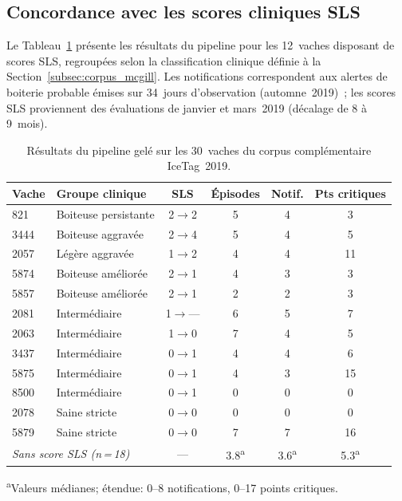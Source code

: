 \subsection{Concordance avec les scores cliniques SLS}

Le Tableau~\ref{tab:mcgill_resultats} présente les résultats du pipeline pour les
12~vaches disposant de scores SLS, regroupées selon la classification clinique
définie à la Section~\ref{subsec:corpus_mcgill}. Les notifications correspondent aux
alertes de boiterie probable émises sur 34~jours d'observation (automne~2019)~; les
scores SLS proviennent des évaluations de janvier et mars~2019 (décalage de 8
à 9~mois).

\begin{table}[H]
    \centering
    \small
    \caption{Résultats du pipeline gelé sur les 30~vaches du corpus complémentaire
    IceTag~2019.}
    \label{tab:mcgill_resultats}
    \begin{tabular}{llcccc}
        \toprule
        \textbf{Vache} & \textbf{Groupe clinique} & \textbf{SLS} &
        \textbf{Épisodes} & \textbf{Notif.} & \textbf{Pts critiques} \\
        \midrule
        821  & Boiteuse persistante & 2$\to$2 & 5 & 4 & 3 \\
        3444 & Boiteuse aggravée    & 2$\to$4 & 5 & 4 & 5 \\
        2057 & Légère aggravée      & 1$\to$2 & 4 & 4 & 11 \\
        5874 & Boiteuse améliorée   & 2$\to$1 & 4 & 3 & 3 \\
        5857 & Boiteuse améliorée   & 2$\to$1 & 2 & 2 & 3 \\
        \midrule
        2081 & Intermédiaire        & 1$\to$— & 6 & 5 & 7 \\
        2063 & Intermédiaire        & 1$\to$0 & 7 & 4 & 5 \\
        3437 & Intermédiaire        & 0$\to$1 & 4 & 4 & 6 \\
        5875 & Intermédiaire        & 0$\to$1 & 4 & 3 & 15 \\
        8500 & Intermédiaire        & 0$\to$1 & 0 & 0 & 0 \\
        \midrule
        2078 & Saine stricte        & 0$\to$0 & 0 & 0 & 0 \\
        5879 & Saine stricte        & 0$\to$0 & 7 & 7 & 16 \\
        \midrule
        \multicolumn{2}{l}{\textit{Sans score SLS (n\,=\,18)}}
             & — & 3.8\textsuperscript{a} & 3.6\textsuperscript{a}
             & 5.3\textsuperscript{a} \\
        \bottomrule
    \end{tabular}

    \vspace{2pt}
    {\footnotesize \textsuperscript{a}Valeurs médianes; étendue: 0--8
    notifications, 0--17 points critiques.}
\end{table}

